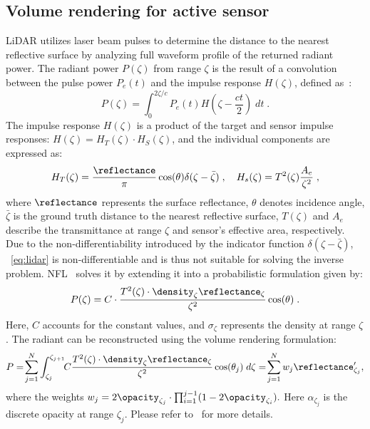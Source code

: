 \subsection{Volume rendering for active sensor} 
\label{sec:vol_render_background}
LiDAR utilizes laser beam pulses to determine the distance to the nearest reflective surface by analyzing full waveform profile of the returned radiant power. The radiant power $P(\zeta)$ from range $\zeta$ is the result of a convolution between the pulse power $P_e(t)$ and the impulse response $H(\zeta)$, defined as~\cite{hahner2021fog,hahner2022lidar,Huang2023nfl}:
\begin{equation}
    P(\zeta) = \int_0^{2\zeta/c} P_e(t) H(\zeta - \frac{ct}{2}) \; dt\;.
\label{eq:lidar}
\end{equation}
The impulse response $H(\zeta)$ is a product of the target and sensor impulse responses: $H(\zeta) = H_T(\zeta)\cdot H_S(\zeta)$, and the individual components are expressed as:
\begin{equation}
    H_T(\zeta) = \frac{\reflectance}{\pi} \cos(\theta) \delta(\zeta - \bar{\zeta})\;, \quad  H_s(\zeta) = T^2(\zeta) \frac{A_e}{\zeta^2}\;,
\label{eq:ht}
\end{equation}
where $\reflectance$ represents the surface reflectance, $\theta$ denotes incidence angle, $\bar{\zeta}$ is the ground truth distance to the nearest reflective surface, $T(\zeta)$ and $A_e$ describe the transmittance at range $\zeta$ and sensor's effective area, respectively. Due to the non-differentiability introduced by the indicator function $\delta(\zeta - \bar{\zeta})$, ~\cref{eq:lidar} is non-differentiable and is thus not suitable for solving the inverse problem. NFL~\cite{Huang2023nfl} solves it by extending it into a probabilistic formulation given by:
\begin{equation}
P(\zeta) = C \cdot \frac{T^2(\zeta) \cdot \density_\zeta  \reflectance_\zeta}{\zeta^2} \cos(\theta)\;.
\label{eq:radiance}
\end{equation}
Here, $C$ accounts for the constant values, and $\sigma_\zeta$ represents the density at range $\zeta$. The radiant can be reconstructed using the volume rendering formulation:
\begin{equation}
      P
      =\!\sum_{j=1}^N \int_{\zeta_j}^{\zeta_{j+1}}\!\!C \frac{T^2({\zeta}) \cdot \density_\zeta \reflectance_\zeta}{\zeta^2} \cos(\theta_j) \; d\zeta
      =\!\sum_{j=1}^N w_j \reflectance_{\zeta_j}',
\label{eq:radiant_inter}
\end{equation}
where the weights $w_j = 2 \opacity_{\zeta_j} \cdot\prod_{i=1}^{j-1}(1 - 2 \opacity_{\zeta_i}).$
Here $\alpha_{\zeta_j}$ is the discrete opacity at range $\zeta_j$. Please refer to~\cite{Huang2023nfl} for more details.


